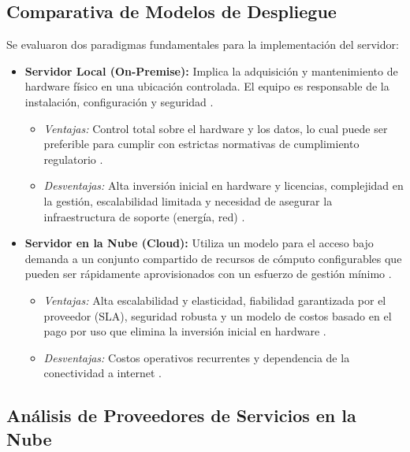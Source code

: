 \subsection{Comparativa de Modelos de Despliegue}
\label{subsec:modelos_despliegue}

Se evaluaron dos paradigmas fundamentales para la implementación del servidor:

\begin{itemize}
    \item \textbf{Servidor Local (On-Premise):} Implica la adquisición y mantenimiento de hardware físico en una ubicación controlada. El equipo es responsable de la instalación, configuración y seguridad \cite{nordlayer2024}.
        \begin{itemize}
            \item \textit{Ventajas:} Control total sobre el hardware y los datos, lo cual puede ser preferible para cumplir con estrictas normativas de cumplimiento regulatorio \cite{nordlayer2024}.
            \item \textit{Desventajas:} Alta inversión inicial en hardware y licencias, complejidad en la gestión, escalabilidad limitada y necesidad de asegurar la infraestructura de soporte (energía, red) \cite{softteco2024}.
        \end{itemize}
    \item \textbf{Servidor en la Nube (Cloud):} Utiliza un modelo para el acceso bajo demanda a un conjunto compartido de recursos de cómputo configurables que pueden ser rápidamente aprovisionados con un esfuerzo de gestión mínimo \cite{mell2011nist}.
        \begin{itemize}
            \item \textit{Ventajas:} Alta escalabilidad y elasticidad, fiabilidad garantizada por el proveedor (SLA), seguridad robusta y un modelo de costos basado en el pago por uso que elimina la inversión inicial en hardware \cite{softteco2024}.
            \item \textit{Desventajas:} Costos operativos recurrentes y dependencia de la conectividad a internet \cite{softteco2024}.
        \end{itemize}
\end{itemize}

\subsection{Análisis de Proveedores de Servicios en la Nube}
\label{subsec:proveedores_nube}

